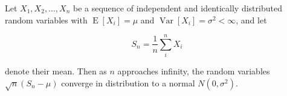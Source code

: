 \documentclass{article}
\begin{document}

Let $X_1,X_2,\ldots,X_n$ be a sequence of independent and
identically distributed random variables with
$\operatorname{E}[X_i]=\mu$ and $\operatorname{Var}[X_i]=\sigma^2<\infty$,
and let

\begin{equation*}
S_n=\frac{1}{n}\sum_i^n X_i
\end{equation*}

denote their mean. Then as $n$ approaches infinity, the
random variables $\sqrt{n}(S_n-\mu)$ converge in
distribution to a normal $N(0,\sigma^2)$.
\end{document}
